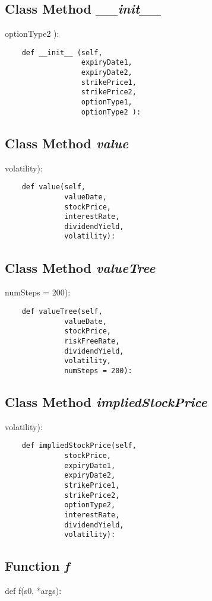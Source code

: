 \documentclass[twoside,11pt]{book}
\begin{document}
\subsection{Class Method {\it \_\_init\_\_ }}
optionType2 ):

\begin{lstlisting}
    def __init__ (self,
                  expiryDate1,
                  expiryDate2,
                  strikePrice1,
                  strikePrice2,
                  optionType1,
                  optionType2 ):
\end{lstlisting}

\subsection{Class Method {\it value}}
volatility):

\begin{lstlisting}
    def value(self,
              valueDate,
              stockPrice,
              interestRate,
              dividendYield,
              volatility):
\end{lstlisting}

\subsection{Class Method {\it valueTree}}
numSteps = 200):

\begin{lstlisting}
    def valueTree(self,
              valueDate,
              stockPrice,
              riskFreeRate,
              dividendYield,
              volatility,
              numSteps = 200):
\end{lstlisting}

\subsection{Class Method {\it impliedStockPrice}}
volatility):

\begin{lstlisting}
    def impliedStockPrice(self,
              stockPrice,
              expiryDate1,
              expiryDate2,
              strikePrice1, 
              strikePrice2, 
              optionType2,
              interestRate, 
              dividendYield, 
              volatility):
\end{lstlisting}

\subsection{Function {\it f}}
def f(s0, *args):
\end{document}
